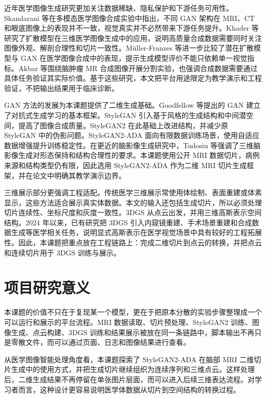 近年医学图像生成研究更加关注数据稀缺、隐私保护和下游任务可用性。Skandarani 等在多模态医学图像合成实验中指出，不同 GAN 架构在 MRI、CT 和眼底图像上的表现并不一致，视觉真实并不必然带来下游任务提升\cite{skandarani2023gans}。Khader 等研究了扩散模型在三维医学图像生成中的应用，说明高质量合成数据需要同时关注图像外观、解剖合理性和切片一致性\cite{khader2023ddpm3d}。Müller-Franzes 等进一步比较了潜在扩散模型与 GAN 在医学图像合成中的表现，提示生成模型评价不能只依赖单一视觉指标\cite{mullerfranzes2023comparison}。Akbar 等围绕脑肿瘤 MR 合成图像开展分割实验，也强调合成数据需要通过具体任务验证其实际价值\cite{akbar2024syntheticmr}。基于这些研究，本文把平台用途限定为教学演示和工程验证，不把输出结果用于临床诊断。

GAN 方法的发展为本课题提供了二维生成基础。Goodfellow 等提出的 GAN 建立了对抗式生成学习的基本框架\cite{goodfellow2014gan}。StyleGAN 引入基于风格的生成结构和中间潜空间，提高了图像合成质量\cite{karras2019stylegan}。StyleGAN2 在此基础上改进结构，并减少原 StyleGAN 中的伪影问题\cite{karras2020stylegan2}。StyleGAN2-ADA 面向有限数据训练场景，使用自适应数据增强提升训练稳定性\cite{karras2020ada}。在更近的脑影像生成研究中，Tudosiu 等强调了三维脑影像生成对形态保持和结构合理性的要求\cite{tudosiu2024brain}。本课题使用公开 MRI 数据切片，病例来源和结构类型仍有限，因此选用 StyleGAN2-ADA 作为二维 MRI 切片生成框架，并在论文中明确其教学演示边界。

三维展示部分更强调工程适配。传统医学三维展示常使用体绘制、表面重建或体素显示，这些方法适合展示真实体数据。本文的输入还包括生成切片，所以必须处理切片连续性、坐标尺度和灰度一致性。3DGS 从点云出发，并用三维高斯表示空间结构\cite{kerbl20233dgs}。2024 年以来，已有研究把 3DGS 引入内窥镜重建、手术场景重建和合成数据生成等医学相关任务，说明显式高斯表示在医学视觉场景中具有较好的工程拓展性\cite{bonilla2024gaussianpancakes,huang2024endo4dgs,guo2024freesurgs,zeng2024surgical3dgs}。因此，本课题把重点放在工程链路上：完成二维切片到点云的转换，并把点云和连续切片用于 3DGS 训练与展示。

\section{项目研究意义}
本课题的价值不只在于复现某一个模型，更在于把原本分散的实验步骤整理成一个可以运行和展示的平台流程。MRI 数据读取、切片预处理、StyleGAN2 训练、图像生成、点云构建、3DGS 训练和结果展示被放在同一条链路中，脚本输出不再只是零散文件，而可以通过页面、日志和图像结果进行查看。

从医学图像智能处理角度看，本课题探索了 StyleGAN2-ADA 在脑部 MRI 二维切片生成中的使用方式，并把生成切片继续组织为连续序列和三维点云。这样处理后，二维生成结果不再停留在单张图片层面，而可以进入后续三维表达流程。对学习者而言，这种设计更容易说明医学体数据从切片到空间结构的转换过程。


